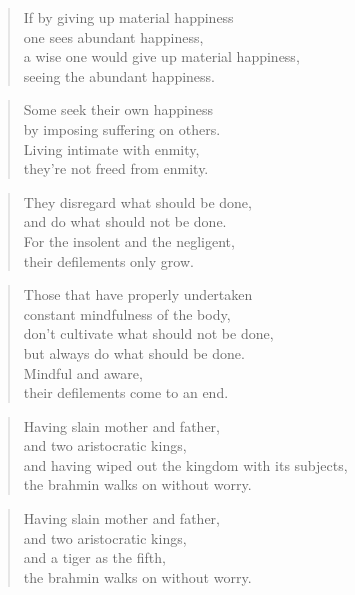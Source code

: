 \documentclass[12pt,openany]{book}%
\begin{document}
\begin{verse}%
If by giving up material happiness \\
one sees abundant happiness, \\
a wise one would give up material happiness, \\
seeing the abundant happiness. 

%
\end{verse}

\begin{verse}%
Some seek their own happiness \\
by imposing suffering on others. \\
Living intimate with enmity, \\
they’re not freed from enmity. 

%
\end{verse}

\begin{verse}%
They disregard what should be done, \\
and do what should not be done. \\
For the insolent and the negligent, \\
their defilements only grow. 

%
\end{verse}

\begin{verse}%
Those that have properly undertaken \\
constant mindfulness of the body, \\
don’t cultivate what should not be done, \\
but always do what should be done. \\
Mindful and aware, \\
their defilements come to an end. 

%
\end{verse}

\begin{verse}%
Having slain mother and father, \\
and two aristocratic kings, \\
and having wiped out the kingdom with its subjects, \\
the brahmin walks on without worry. 

%
\end{verse}

\begin{verse}%
Having slain mother and father, \\
and two aristocratic kings, \\
and a tiger as the fifth, \\
the brahmin walks on without worry. 

%
\end{verse}
\end{document}
